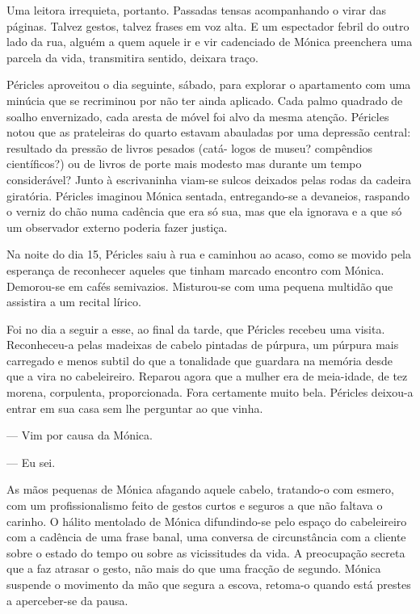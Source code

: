 Uma leitora irrequieta, portanto. Passadas tensas acompanhando o virar
das páginas. Talvez gestos, talvez frases em voz alta. E um espectador
febril do outro lado da rua, alguém a quem aquele ir e vir cadenciado de
Mónica preenchera uma parcela da vida, transmitira sentido, deixara
traço.

Péricles aproveitou o dia seguinte, sábado, para explorar o apartamento
com uma minúcia que se recriminou por não ter ainda aplicado. Cada palmo
quadrado de soalho envernizado, cada aresta de móvel foi alvo da mesma
atenção. Péricles notou que as prateleiras do quarto estavam abauladas
por uma depressão central: resultado da pressão de livros pesados
(catá- logos de museu? compêndios científicos?) ou de livros de porte
mais modesto mas durante um tempo considerável? Junto à escrivaninha
viam-se sulcos deixados pelas rodas da cadeira giratória. Péricles
imaginou Mónica sentada, entregando-se a devaneios, raspando o verniz do
chão numa cadência que era só sua, mas que ela ignorava e a que só um
observador externo poderia fazer justiça.

Na noite do dia 15, Péricles saiu à rua e caminhou ao acaso, como se
movido pela esperança de reconhecer aqueles que tinham marcado encontro com Mónica. Demorou-se em cafés
semivazios. Misturou-se com uma pequena multidão que assistira a um
recital lírico.

Foi no dia a seguir a esse, ao final da tarde, que Péricles recebeu uma
visita. Reconheceu-a pelas madeixas de cabelo pintadas de púrpura, um
púrpura mais carregado e menos subtil do que a tonalidade que guardara
na memória desde que a vira no cabeleireiro. Reparou agora que a mulher
era de meia-idade, de tez morena, corpulenta, proporcionada. Fora
certamente muito bela. Péricles deixou-a entrar em sua casa sem lhe
perguntar ao que vinha.

--- Vim por causa da Mónica.

--- Eu sei.


As mãos pequenas de Mónica afagando aquele cabelo, tratando-o com
esmero, com um profissionalismo feito de gestos curtos e seguros a que
não faltava o carinho. O hálito mentolado de Mónica difundindo-se pelo
espaço do cabeleireiro com a cadência de uma frase banal, uma conversa
de circunstância com a cliente sobre o estado do tempo ou sobre as
vicissitudes da vida. A preocupação secreta que a faz atrasar o gesto,
não mais do que uma fracção de segundo. Mónica suspende o movimento da
mão que segura a escova, retoma-o quando está prestes a aperceber-se da
pausa.

